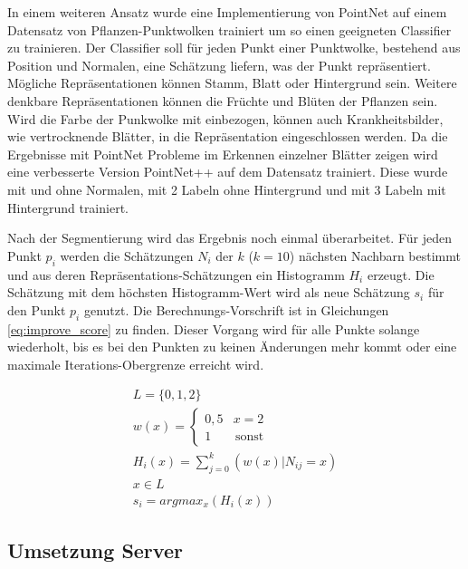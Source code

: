 \documentclass[12pt,titlepage, twoside]{article}
\begin{document}
In einem weiteren Ansatz wurde eine Implementierung von PointNet auf einem Datensatz von Pflanzen-Punktwolken trainiert um so einen geeigneten Classifier zu trainieren.
Der Classifier soll für jeden Punkt einer Punktwolke, bestehend aus Position und Normalen, eine Schätzung liefern, was der Punkt repräsentiert. 
Mögliche Repräsentationen können Stamm, Blatt oder Hintergrund sein.
Weitere denkbare Repräsentationen können die Früchte und Blüten der Pflanzen sein. 
Wird die Farbe der Punkwolke mit einbezogen, können auch Krankheitsbilder, wie vertrocknende Blätter, in die Repräsentation eingeschlossen werden.  
Da die Ergebnisse mit PointNet Probleme im Erkennen einzelner Blätter zeigen wird eine verbesserte Version PointNet++ auf dem Datensatz trainiert. 
Diese wurde mit und ohne Normalen, mit 2 Labeln ohne Hintergrund und mit 3 Labeln mit Hintergrund trainiert.

Nach der Segmentierung wird das Ergebnis noch einmal überarbeitet. 
Für jeden Punkt $p_i$ werden die Schätzungen $N_i$ der $k$ ($k=10$) nächsten Nachbarn bestimmt und aus deren Repräsentations-Schätzungen ein Histogramm $H_i$ erzeugt.
Die Schätzung mit dem höchsten Histogramm-Wert wird als neue Schätzung $s_i$ für den Punkt $p_i$ genutzt. Die Berechnungs-Vorschrift ist in Gleichungen \ref{eq:improve_score} zu finden. 
Dieser Vorgang wird für alle Punkte solange wiederholt, bis es bei den Punkten zu keinen Änderungen mehr kommt oder eine maximale Iterations-Obergrenze erreicht wird.

\begin{equation}
\label{eq:improve_score}
\begin{array}{l}
L =  \{0,1,2\}\\
w(x) = \left\{
\begin{array}{ll}
0,5 & x = 2 \\
1 & \, \textrm{sonst} 
\end{array}
\right.\\ 
H_i(x) = \sum_{j=0}^{k}{(w(x) | N_{ij} = x)}\\
x \in L\\
s_i = argmax_x(H_i(x))
\end{array}
\end{equation}

\subsection{Umsetzung Server}
\label{sec:realisierung:implementierung4}
\end{document}
